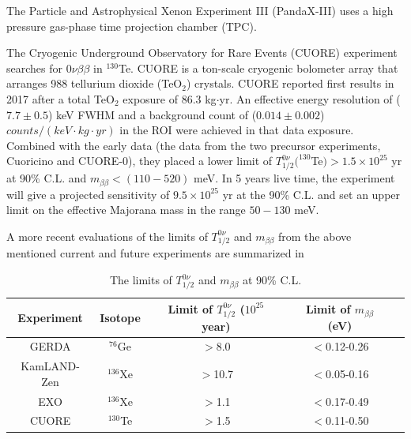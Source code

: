 The Particle and Astrophysical Xenon Experiment III (PandaX-III) uses a high pressure gas-phase time projection chamber (TPC).

The Cryogenic Underground Observatory for Rare Events (CUORE) experiment searches for $0\nu\beta\beta$ in $^{130}$Te. CUORE is a ton-scale cryogenic bolometer array that arranges 988 tellurium dioxide (TeO$_2$) crystals. CUORE reported first results in 2017 after a total TeO$_2$ exposure of 86.3 kg$\cdot$yr. An effective energy resolution of ($7.7\pm 0.5$) keV FWHM and a background count of ($0.014\pm0.002$) $counts/(keV\cdot kg\cdot yr)$ in the ROI were achieved in that data exposure. Combined with the early data (the data from the two precursor experiments, Cuoricino and CUORE-0), they placed a lower limit of $T^{0\nu}_{1/2}(^{130}$Te$)>1.5\times 10^{25}$ yr at 90\% C.L. and $m_{\beta\beta}<(110-520)$ meV\cite{alduino2018first}. In 5 years live time, the experiment will give a projected sensitivity of $9.5\times 10^{25}$ yr at the 90\% C.L. and set an upper limit on the effective Majorana mass in the range $50-130$ meV\cite{piperno2015dark}.

A more recent evaluations of the limits of $T^{0\nu}_{1/2}$ and $m_{\beta\beta}$ from the above mentioned
current and future experiments are summarized in

\begin{table}[ht]
	\caption{\label{gerdatable} The limits of $T^{0\nu}_{1/2}$ and $m_{\beta\beta}$ at 90\% C.L.}	
	{\centering
		\begin{tabular*}{135mm}{c@{\extracolsep{\fill}}cccc}
			\toprule 
			Experiment & Isotope & Limit of $T^{0\nu}_{1/2}$ ($10^{25}$ year) & Limit of $m_{\beta\beta}$ (eV)\\
			\midrule
			GERDA       & $^{76}$Ge & $>$8.0 & $<$0.12-0.26  \\	
			KamLAND-Zen & $^{136}$Xe & $>$10.7 & $<$0.05-0.16	\\
			EXO         & $^{136}$Xe & $>$1.1 & $<$0.17-0.49  \\	
			CUORE       & $^{130}$Te & $>$1.5 &  $<$0.11-0.50 \\	
			\bottomrule	
		\end{tabular*}
	}
\end{table}
\vspace{1cm}

